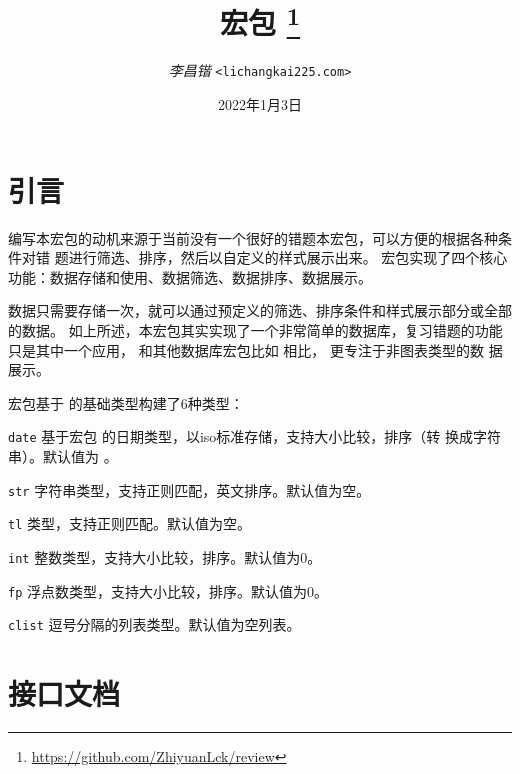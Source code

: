 \documentclass[full]{l3doc}
\begin{document}
\title{
   宏包
  \protect\footnote{\url{https://github.com/ZhiyuanLck/review}}
}
\author{\textit{李昌锴} \texttt{<lichangkai225\@qq.com>}}
\date{2022年1月3日}
\maketitle

{\small
\tableofcontents
}
\newpage

\begin{documentation}

\section{引言}
编写本宏包的动机来源于当前没有一个很好的错题本宏包，可以方便的根据各种条件对错
题进行筛选、排序，然后以自定义的样式展示出来。 宏包实现了四个核心
功能：数据存储和使用、数据筛选、数据排序、数据展示。

数据只需要存储一次，就可以通过预定义的筛选、排序条件和样式展示部分或全部的数据。
如上所述，本宏包其实实现了一个非常简单的数据库，复习错题的功能只是其中一个应用，
和其他数据库宏包比如  相比， 更专注于非图表类型的数
据展示。

宏包基于  的基础类型构建了6种类型：
\begin{Description}
  \item[\texttt{date}]
    基于宏包  的日期类型，以iso标准存储，支持大小比较，排序（转
    换成字符串）。默认值为 。
  \item[\texttt{str}]
    字符串类型，支持正则匹配，英文排序。默认值为空。
  \item[\texttt{tl}]
    类型，支持正则匹配。默认值为空。
  \item[\texttt{int}]
    整数类型，支持大小比较，排序。默认值为0。
  \item[\texttt{fp}]
    浮点数类型，支持大小比较，排序。默认值为0。
  \item[\texttt{clist}]
    逗号分隔的列表类型。默认值为空列表。
\end{Description}

\section{接口文档}

\end{documentation}
\end{document}
